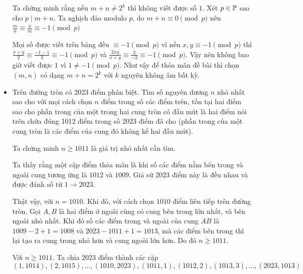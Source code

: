\documentclass[11pt]{scrartcl}
\begin{document}
\begin{itemize}[label=, leftmargin=0em, itemsep=0.5em]
\begin{sol}
        Ta chứng minh rằng nếu $m + n \neq 2^k$ thì không viết được số $1$. Xét $p \in \mathbb{P}$ sao cho $p \mid m + n$. Ta nghịch đảo modulo $p$, do $m + n \equiv 0 \pmod{p}$ nên $\frac{m}{n} \equiv \frac{n}{m} \equiv - 1 \pmod{p}$
      
        Mọi số được viết trên bảng đều $\equiv - 1\pmod{p}$ vì nếu $x,y \equiv -1 \pmod{p}$ thì $\frac{x + y}{2} \equiv \frac{-1 - 1}{2} \equiv - 1\pmod{p}$ và $\frac{2xy}{x + y} \equiv \frac{2}{-2} \equiv -1\pmod{p}$. Vậy nên không bao giờ viết được $1$ vì $1 \neq - 1 \pmod{p}$. Như vậy để thỏa mãn đề bài thì chọn $(m,n)$ có dạng $m + n = 2^k$ với $k$ nguyên không âm bất kỳ.\end{sol}
        \item \begin{bt}
            Trên đường tròn có 2023 điểm phân biệt. Tìm số nguyên dương $n$ nhỏ nhất sao cho với mọi cách chọn $n$ điểm trong số các điểm trên, tồn tại hai điểm sao cho phần trong của một trong hai cung tròn có đầu mút là hai điểm nói trên chứa đúng 1012 điểm trong số 2023 điểm đã cho (phần trong của một cung tròn là các điểm của cung đó không kể hai đầu mút).
        \end{bt}
        \begin{sol}
            Ta chứng minh $n \geq 1011$ là giá trị nhỏ nhất cần tìm.
    
            Ta thấy rằng một cặp điểm thỏa mãn là khi số các điểm nằm bên trong và ngoài cung tương ứng là $1012$ và $1009$.
            Giả sử $2023$ điểm này là đều nhau và được đánh số từ $1 \to 2023$.
    
            Thật vậy, với $n = 1010$. Khi đó, với cách chọn $1010$ điểm liên tiếp trên đường tròn. Gọi $A,B$ là hai điểm ở ngoài cùng có cung bên trong lớn nhất, và bên ngoài nhỏ nhất. Khi đó số các điểm trong và ngoài của cung $AB$ là  $1009 - 2 + 1 = 1008$ và $2023 - 1011 + 1 = 1013$, mà các điểm bên trong thì lại tạo ra cung trong nhỏ hơn và cung ngoài lớn hơn. Do đó $n \geq 1011$.
    
            Với $n \geq 1011$. Ta chia $2023$ điểm thành các cặp 
             \[(1,1014), (2,1015),\dots, (1010, 2023),(1011,1),(1012,2),(1013,3),\dots,(2023,1013) \tag{1}\]
    

\end{sol}
\end{itemize}
\end{document}
